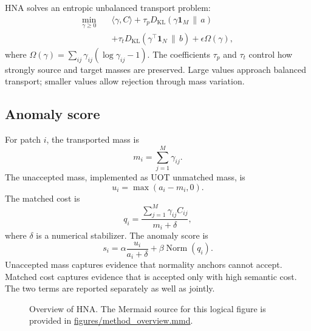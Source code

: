 \documentclass[10pt]{article}
\newcommand{\method}{HNA}
\begin{document}
\method{} solves an entropic unbalanced transport problem:
\begin{equation}
\begin{split}
    \min_{\gamma \geq 0} \quad
    &\langle \gamma, C \rangle
    + \tau_{p} D_{\mathrm{KL}}(\gamma \mathbf{1}_{M} \,\|\, a) \\
    &+ \tau_{t} D_{\mathrm{KL}}(\gamma^{\top}\mathbf{1}_{N} \,\|\, b)
    + \epsilon \Omega(\gamma),
\end{split}
\label{eq:uot}
\end{equation}
where $\Omega(\gamma)=\sum_{ij}\gamma_{ij}(\log \gamma_{ij}-1)$.
The coefficients $\tau_p$ and $\tau_t$ control how strongly source and target masses are preserved.
Large values approach balanced transport; smaller values allow rejection through mass variation.

\subsection{Anomaly score}

For patch $i$, the transported mass is
\begin{equation}
    m_i = \sum_{j=1}^{M} \gamma_{ij}.
\end{equation}
The unaccepted mass, implemented as UOT unmatched mass, is
\begin{equation}
    u_i = \max(a_i - m_i, 0).
\end{equation}
The matched cost is
\begin{equation}
    q_i = \frac{\sum_{j=1}^{M} \gamma_{ij} C_{ij}}{m_i+\delta},
\end{equation}
where $\delta$ is a numerical stabilizer.
The anomaly score is
\begin{equation}
    s_i = \alpha \frac{u_i}{a_i+\delta} + \beta \operatorname{Norm}(q_i).
\end{equation}
Unaccepted mass captures evidence that normality anchors cannot accept.
Matched cost captures evidence that is accepted only with high semantic cost.
The two terms are reported separately as well as jointly.

\begin{figure}[t]
\centering
{}
\caption{Overview of \method{}. The Mermaid source for this logical figure is provided in \url{figures/method_overview.mmd}.}
\label{fig:overview}
\end{figure}
\end{document}
